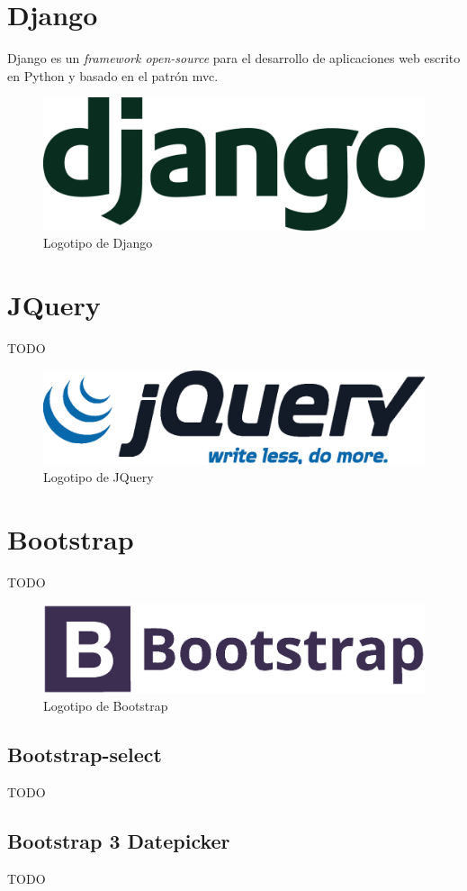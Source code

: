 \section{Django}

Django es un \textit{framework open-source} para el desarrollo de aplicaciones web escrito en Python y basado en el patrón \acrfull{mvc}.

\begin{figure}[!htbp]
	\centering
	\includegraphics[scale=0.18]{fig/django_logo}
	\caption{Logotipo de Django}
\end{figure}

\section{JQuery}

TODO

\begin{figure}[!htbp]
	\centering
	\includegraphics[scale=0.6]{fig/jquery_logo}
	\caption{Logotipo de JQuery}
\end{figure}

\section{Bootstrap}

TODO

\begin{figure}[!htbp]
	\centering
	\includegraphics[scale=0.45]{fig/bootstrap_logo}
	\caption{Logotipo de Bootstrap}
\end{figure}

\subsection{Bootstrap-select}

TODO

\subsection{Bootstrap 3 Datepicker}

TODO